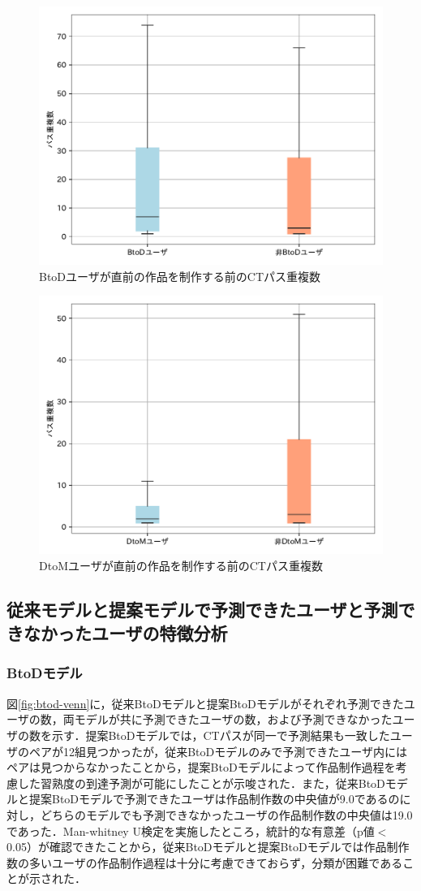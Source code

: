 \documentclass[11pt,dvipdfmx]{jreport}
\begin{document}
\begin{figure}[t]
	\centering
	\includegraphics[width=0.7\linewidth]{Okamoto_fig/add-btod.pdf}
	\caption{BtoDユーザが直前の作品を制作する前のCTパス重複数}
	\label{fig:add-btod}
\end{figure}

\begin{figure}[t]
	\centering
	\includegraphics[width=0.7\linewidth]{Okamoto_fig/add-dtom.pdf}
	\caption{DtoMユーザが直前の作品を制作する前のCTパス重複数}
	\label{fig:add-dtom}
\end{figure}



\subsection{従来モデルと提案モデルで予測できたユーザと予測できなかったユーザの特徴分析}

\subsubsection*{BtoDモデル}

図\ref{fig:btod-venn}に，従来BtoDモデルと提案BtoDモデルがそれぞれ予測できたユーザの数，両モデルが共に予測できたユーザの数，および予測できなかったユーザの数を示す．提案BtoDモデルでは，CTパスが同一で予測結果も一致したユーザのペアが12組見つかったが，従来BtoDモデルのみで予測できたユーザ内にはペアは見つからなかったことから，提案BtoDモデルによって作品制作過程を考慮した習熟度の到達予測が可能にしたことが示唆された．また，従来BtoDモデルと提案BtoDモデルで予測できたユーザは作品制作数の中央値が9.0であるのに対し，どちらのモデルでも予測できなかったユーザの作品制作数の中央値は19.0であった．Man-whitney U検定を実施したところ，統計的な有意差（p値$<$0.05）が確認できたことから，従来BtoDモデルと提案BtoDモデルでは作品制作数の多いユーザの作品制作過程は十分に考慮できておらず，分類が困難であることが示された．
\end{document}
